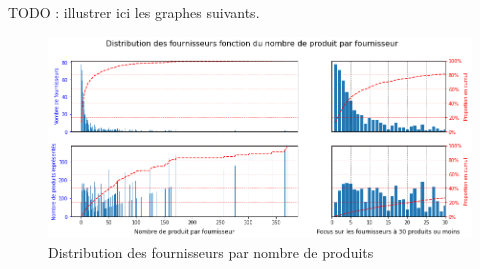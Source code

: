                 TODO : illustrer ici les graphes suivants.

                \begin{figure}[htbp]\CenterFloatBoxes
                    \begin{floatrow}
                    \end{floatrow}
                \end{figure}        

                \begin{figure}[htbp]
                    \begin{center}
                    \includegraphics[width=\linewidth]{img/distribution_fournisseurs_par_prd_count.png}
                    \end{center}
                    \caption{Distribution des fournisseurs par nombre de produits}
                    \label{fig:distrib_fourn_pdts}
                \end{figure}

